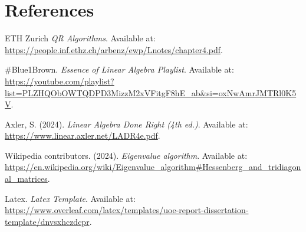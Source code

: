 \documentclass[12pt]{article}
\begin{document}
\section{References}
\begin{thebibliography}{9}

ETH Zurich \textit{QR Algorithms}. Available at: \url{https://people.inf.ethz.ch/arbenz/ewp/Lnotes/chapter4.pdf}.

#Blue1Brown. \textit{Essence of Linear Algebra Playlist}. Available at: \url{https://youtube.com/playlist?list=PLZHQObOWTQDPD3MizzM2xVFitgF8hE_ab&si=oxNwAmrJMTRl0K5V}.

Axler, S. (2024). \textit{Linear Algebra Done Right (4th ed.)}. Available at: \url{https://www.linear.axler.net/LADR4e.pdf}.

Wikipedia contributors. (2024). \textit{Eigenvalue algorithm}. Available at: \url{https://en.wikipedia.org/wiki/Eigenvalue_algorithm#Hessenberg_and_tridiagonal_matrices}.

    Latex. \textit{Latex Template}. Available at: \url{https://www.overleaf.com/latex/templates/uoe-report-dissertation-template/dnvsxhczdcpr}.
\end{thebibliography}
\end{document}
